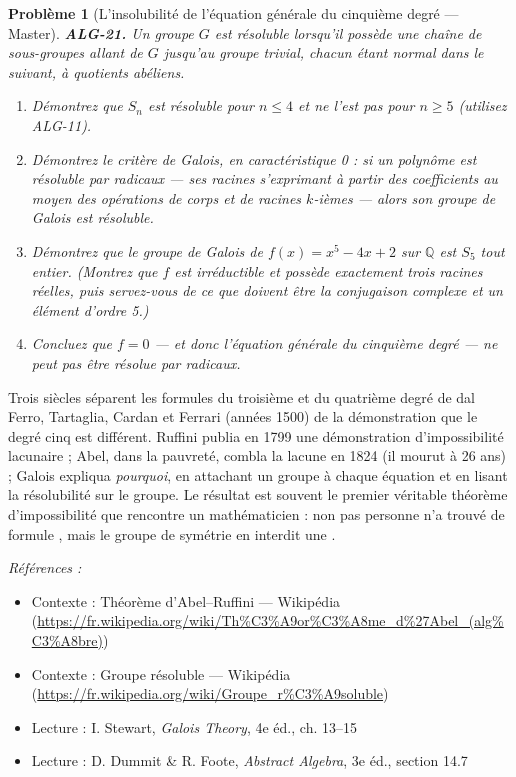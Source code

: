 \documentclass[11pt]{article}
\newtheorem{problem}{Problème}
\newenvironment{refs}{\par\small\noindent\emph{Références :}\begin{itemize}\setlength\itemsep{0pt}}{\end{itemize}\normalsize}
\begin{document}
\bigskip

\begin{problem}[{L'insolubilité de l'équation générale du cinquième degré --- Master}]
\textbf{ALG-21.} Un groupe $G$ est \textit{résoluble} lorsqu'il possède une chaîne de
sous-groupes allant de $G$ jusqu'au groupe trivial, chacun étant normal dans le suivant, à quotients abéliens.
\begin{enumerate}
\item[(i)] Démontrez que $S_n$ est résoluble pour $n \le 4$ et ne l'est pas pour $n \ge 5$ (utilisez
ALG-11).
\item[(ii)] Démontrez le critère de Galois, en caractéristique 0 : si un polynôme est résoluble par
radicaux --- ses racines s'exprimant à partir des coefficients au moyen des opérations de corps et de racines
$k$-ièmes --- alors son groupe de Galois est résoluble.
\item[(iii)] Démontrez que le groupe de Galois de
$f(x) = x^5 - 4x + 2$ sur $\mathbb{Q}$ est $S_5$ tout entier. (Montrez que $f$ est irréductible et
possède exactement trois racines réelles, puis servez-vous de ce que doivent être la conjugaison complexe et
un élément d'ordre 5.)
\item[(iv)] Concluez que $f = 0$ --- et donc l'équation générale du cinquième degré --- ne peut pas être résolue par
radicaux.
\end{enumerate}

\end{problem}

\noindent Trois siècles séparent les formules du troisième et du quatrième degré de dal Ferro,
Tartaglia, Cardan et Ferrari (années 1500) de la démonstration que le degré cinq est différent. Ruffini
publia en 1799 une démonstration d'impossibilité lacunaire ; Abel, dans la pauvreté, combla la lacune en 1824
(il mourut à 26 ans) ; Galois expliqua \textit{pourquoi}, en attachant un groupe à chaque équation et en lisant
la résolubilité sur le groupe. Le résultat est souvent le premier véritable théorème d'impossibilité que
rencontre un mathématicien : non pas \og{} personne n'a trouvé de formule \fg{}, mais \og{} le groupe de symétrie en
interdit une \fg{}.

\begin{refs}
\item Contexte : Théorème d'Abel--Ruffini --- Wikipédia (\url{https://fr.wikipedia.org/wiki/Th%C3%A9or%C3%A8me_d%27Abel_(alg%C3%A8bre)})
\item Contexte : Groupe résoluble --- Wikipédia (\url{https://fr.wikipedia.org/wiki/Groupe_r%C3%A9soluble})
\item Lecture : I. Stewart, \textit{Galois Theory}, 4e éd., ch. 13--15
\item Lecture : D. Dummit \& R. Foote, \textit{Abstract Algebra}, 3e éd., section 14.7
\end{refs}
\end{document}
